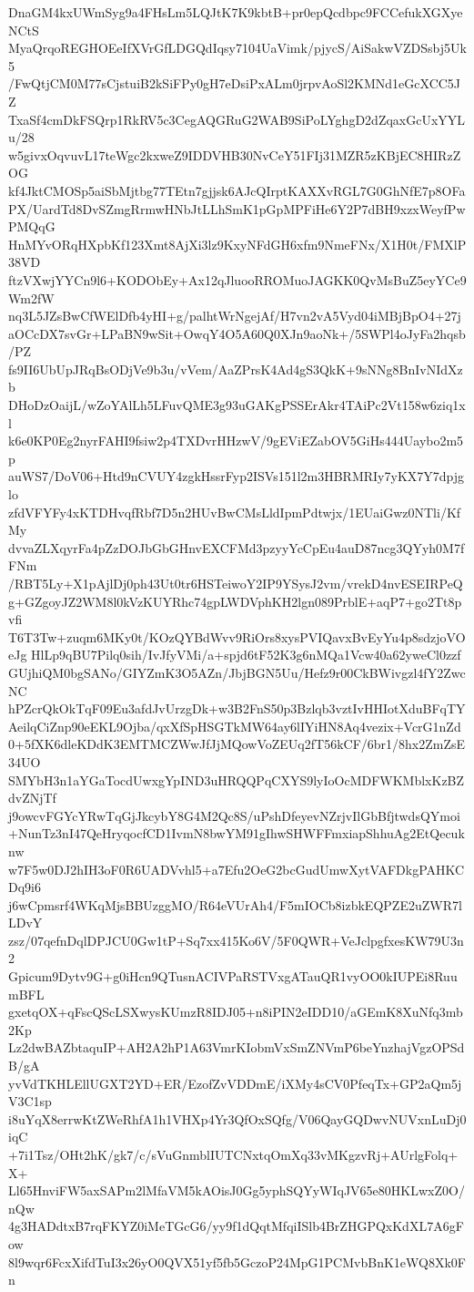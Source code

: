 DnaGM4kxUWmSyg9a4FHsLm5LQJtK7K9kbtB+pr0epQcdbpc9FCCefukXGXyeNCtS
MyaQrqoREGHOEeIfXVrGfLDGQdIqsy7104UaVimk/pjycS/AiSakwVZDSsbj5Uk5
/FwQtjCM0M77sCjstuiB2kSiFPy0gH7eDsiPxALm0jrpvAoSl2KMNd1eGcXCC5JZ
TxaSf4cmDkFSQrp1RkRV5c3CegAQGRuG2WAB9SiPoLYghgD2dZqaxGcUxYYLu/28
w5givxOqvuvL17teWgc2kxweZ9IDDVHB30NvCeY51FIj31MZR5zKBjEC8HIRzZOG
kf4JktCMOSp5aiSbMjtbg77TEtn7gjjsk6AJcQIrptKAXXvRGL7G0GhNfE7p8OFa
PX/UardTd8DvSZmgRrmwHNbJtLLhSmK1pGpMPFiHe6Y2P7dBH9xzxWeyfPwPMQqG
HnMYvORqHXpbKf123Xmt8AjXi3lz9KxyNFdGH6xfm9NmeFNx/X1H0t/FMXlP38VD
ftzVXwjYYCn9l6+KODObEy+Ax12qJluooRROMuoJAGKK0QvMsBuZ5eyYCe9Wm2fW
nq3L5JZsBwCfWElDfb4yHI+g/palhtWrNgejAf/H7vn2vA5Vyd04iMBjBpO4+27j
aOCcDX7svGr+LPaBN9wSit+OwqY4O5A60Q0XJn9aoNk+/5SWPl4oJyFa2hqsb/PZ
fs9II6UbUpJRqBsODjVe9b3u/vVem/AaZPrsK4Ad4gS3QkK+9sNNg8BnIvNIdXzb
DHoDzOaijL/wZoYAlLh5LFuvQME3g93uGAKgPSSErAkr4TAiPc2Vt158w6ziq1xl
k6e0KP0Eg2nyrFAHI9fsiw2p4TXDvrHHzwV/9gEViEZabOV5GiHs444Uaybo2m5p
auWS7/DoV06+Htd9nCVUY4zgkHssrFyp2ISVs151l2m3HBRMRIy7yKX7Y7dpjglo
zfdVFYFy4xKTDHvqfRbf7D5n2HUvBwCMsLldIpmPdtwjx/1EUaiGwz0NTli/KfMy
dvvaZLXqyrFa4pZzDOJbGbGHnvEXCFMd3pzyyYcCpEu4auD87ncg3QYyh0M7fFNm
/RBT5Ly+X1pAjlDj0ph43Ut0tr6HSTeiwoY2IP9YSysJ2vm/vrekD4nvESEIRPeQ
g+GZgoyJZ2WM8l0kVzKUYRhc74gpLWDVphKH2lgn089PrblE+aqP7+go2Tt8pvfi
T6T3Tw+zuqm6MKy0t/KOzQYBdWvv9RiOrs8xysPVIQavxBvEyYu4p8sdzjoVOeJg
HlLp9qBU7Pilq0sih/IvJfyVMi/a+spjd6tF52K3g6nMQa1Vcw40a62yweCl0zzf
GUjhiQM0bgSANo/GIYZmK3O5AZn/JbjBGN5Uu/Hefz9r00CkBWivgzl4fY2ZwcNC
hPZcrQkOkTqF09Eu3afdJvUrzgDk+w3B2FnS50p3Bzlqb3vztIvHHIotXduBFqTY
AeilqCiZnp90eEKL9Ojba/qxXfSpHSGTkMW64ay6lIYiHN8Aq4vezix+VcrG1nZd
0+5fXK6dleKDdK3EMTMCZWwJfJjMQowVoZEUq2fT56kCF/6br1/8hx2ZmZsE34UO
SMYbH3n1aYGaTocdUwxgYpIND3uHRQQPqCXYS9lyIoOcMDFWKMblxKzBZdvZNjTf
j9owcvFGYcYRwTqGjJkcybY8G4M2Qc8S/uPshDfeyevNZrjvIlGbBfjtwdsQYmoi
+NunTz3nI47QeHryqocfCD1IvmN8bwYM91gIhwSHWFFmxiapShhuAg2EtQecuknw
w7F5w0DJ2hIH3oF0R6UADVvhl5+a7Efu2OeG2bcGudUmwXytVAFDkgPAHKCDq9i6
j6wCpmsrf4WKqMjsBBUzggMO/R64eVUrAh4/F5mIOCb8izbkEQPZE2uZWR7lLDvY
zsz/07qefnDqlDPJCU0Gw1tP+Sq7xx415Ko6V/5F0QWR+VeJclpgfxesKW79U3n2
Gpicum9Dytv9G+g0iHcn9QTusnACIVPaRSTVxgATauQR1vyOO0kIUPEi8RuumBFL
gxetqOX+qFscQScLSXwysKUmzR8IDJ05+n8iPIN2eIDD10/aGEmK8XuNfq3mb2Kp
Lz2dwBAZbtaquIP+AH2A2hP1A63VmrKIobmVxSmZNVmP6beYnzhajVgzOPSdB/gA
yvVdTKHLEllUGXT2YD+ER/EzofZvVDDmE/iXMy4sCV0PfeqTx+GP2aQm5jV3C1sp
i8uYqX8errwKtZWeRhfA1h1VHXp4Yr3QfOxSQfg/V06QayGQDwvNUVxnLuDj0iqC
+7i1Tsz/OHt2hK/gk7/c/sVuGnmblIUTCNxtqOmXq33vMKgzvRj+AUrlgFolq+X+
Ll65HnviFW5axSAPm2lMfaVM5kAOisJ0Gg5yphSQYyWIqJV65e80HKLwxZ0O/nQw
4g3HADdtxB7rqFKYZ0iMeTGcG6/yy9f1dQqtMfqiISlb4BrZHGPQxKdXL7A6gFow
8l9wqr6FcxXifdTuI3x26yO0QVX51yf5fb5GczoP24MpG1PCMvbBnK1eWQ8Xk0Fn
